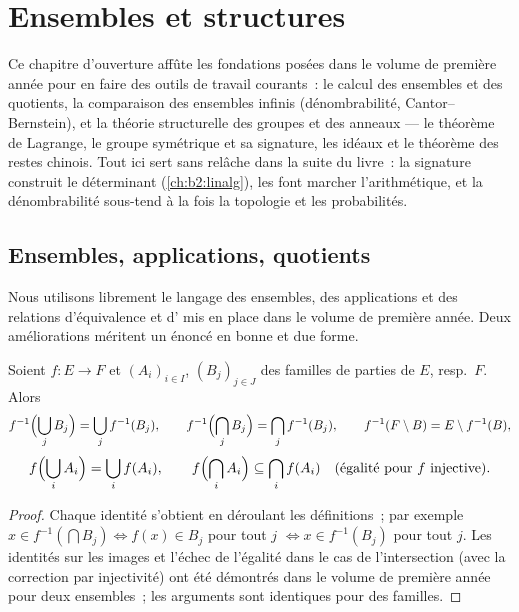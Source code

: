 \chapter{Ensembles et structures}\label{ch:b2:structures}

Ce chapitre d'ouverture affûte les fondations posées dans le volume
de première année pour en faire des outils de travail courants~: le
calcul des ensembles et des quotients, la comparaison des ensembles
infinis (dénombrabilité, Cantor--Bernstein), et la théorie
structurelle des groupes et des anneaux --- le théorème de Lagrange,
le groupe symétrique et sa signature, les idéaux et le théorème des
restes chinois. Tout ici sert sans relâche dans la suite du livre~:
la signature construit le déterminant
(\cref{ch:b2:linalg}), les  font marcher
l'arithmétique, et la dénombrabilité sous-tend à la fois la topologie
et les probabilités.

\section{Ensembles, applications, quotients}

Nous utilisons librement le langage des ensembles, des applications
et des relations d'équivalence et d' mis en place dans le volume
de première année. Deux améliorations méritent un énoncé en bonne et
due forme.

\begin{proposition}\label{prop:b2:structures:images}
Soient $f \colon E \to F$ et $(A_i)_{i \in I}$, $(B_j)_{j \in J}$
des familles de parties de $E$, resp.\ $F$. Alors
\[
f^{-1}\Bigl(\bigcup_j B_j\Bigr) = \bigcup_j f^{-1}(B_j),
\qquad
f^{-1}\Bigl(\bigcap_j B_j\Bigr) = \bigcap_j f^{-1}(B_j),
\qquad
f^{-1}(F \setminus B) = E \setminus f^{-1}(B),
\]
\[
f\Bigl(\bigcup_i A_i\Bigr) = \bigcup_i f(A_i),
\qquad
f\Bigl(\bigcap_i A_i\Bigr) \subseteq \bigcap_i f(A_i)
\quad (\text{égalité pour } f \text{ injective}).
\]
\end{proposition}

\begin{proof}
Chaque identité s'obtient en déroulant les définitions~; par exemple
$x \in f^{-1}(\bigcap B_j) \iff f(x) \in B_j$ pour tout $j$ $\iff x \in
f^{-1}(B_j)$ pour tout $j$. Les identités sur les images et l'échec de
l'égalité dans le cas de l'intersection (avec la correction par
injectivité) ont été démontrés dans le volume de première année pour
deux ensembles~; les arguments sont identiques pour des familles.
\end{proof}

